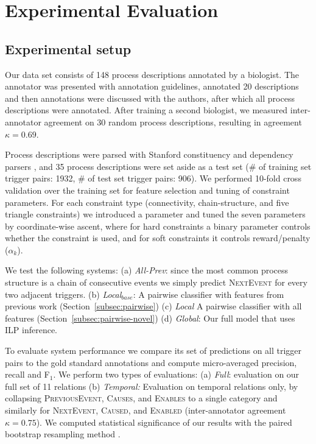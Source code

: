 \section{Experimental Evaluation}

\subsection{Experimental setup}

Our data set consists of 148 process descriptions annotated by a biologist. The annotator was presented with annotation guidelines, annotated 20 descriptions and then annotations were discussed with the authors, after which all process descriptions were annotated. After training a second biologist, we measured inter-annotator agreement on 30 random process descriptions, resulting in agreement $\kappa=0.69$. 

Process descriptions were parsed with Stanford constituency and dependency parsers \cite{Klein03,Marneffe06}, and 35 process descriptions were set aside as a test set (\# of training set trigger pairs: 1932, \# of test set trigger pairs: 906). We performed 10-fold cross validation over the training set for feature selection and tuning of constraint parameters. For each constraint type (connectivity, chain-structure, and five triangle constraints) we introduced a parameter and tuned the seven parameters by coordinate-wise ascent, where for hard constraints a binary parameter controls whether the constraint is used, and for soft constraints it controls reward/penalty ($\alpha_k$).

We test the following systems: (a) \emph{All-Prev}: since the most common process structure is a chain of consecutive events we simply predict \textsc{NextEvent} for every two adjacent triggers. (b) \emph{Local$_{base}$}: A pairwise classifier with features from previous work (Section~\ref{subsec:pairwise}) (c) \emph{Local} A pairwise classifier with all features (Section~\ref{subsec:pairwise-novel}) (d) \emph{Global}: Our full model that uses ILP inference.


To evaluate system performance we compare its set of predictions on all trigger pairs to the gold standard annotations and compute micro-averaged precision, recall and F$_1$. We perform two types of evaluations: (a) \emph{Full}: evaluation on our full set of 11 relations (b) \emph{Temporal:} Evaluation on temporal relations only, by collapsing \textsc{PreviousEvent}, \textsc{Causes}, and \textsc{Enables} to a single category and similarly for \textsc{NextEvent}, \textsc{Caused}, and \textsc{Enabled} (inter-annotator agreement $\kappa=0.75$). We computed statistical significance of our results with the paired bootstrap resampling method \cite{efron1993}.

